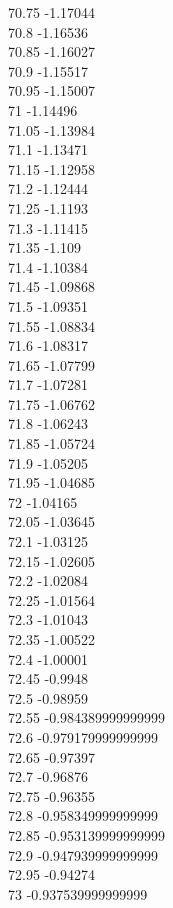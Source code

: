 {70.75	-1.17044\\
70.8	-1.16536\\
70.85	-1.16027\\
70.9	-1.15517\\
70.95	-1.15007\\
71	-1.14496\\
71.05	-1.13984\\
71.1	-1.13471\\
71.15	-1.12958\\
71.2	-1.12444\\
71.25	-1.1193\\
71.3	-1.11415\\
71.35	-1.109\\
71.4	-1.10384\\
71.45	-1.09868\\
71.5	-1.09351\\
71.55	-1.08834\\
71.6	-1.08317\\
71.65	-1.07799\\
71.7	-1.07281\\
71.75	-1.06762\\
71.8	-1.06243\\
71.85	-1.05724\\
71.9	-1.05205\\
71.95	-1.04685\\
72	-1.04165\\
72.05	-1.03645\\
72.1	-1.03125\\
72.15	-1.02605\\
72.2	-1.02084\\
72.25	-1.01564\\
72.3	-1.01043\\
72.35	-1.00522\\
72.4	-1.00001\\
72.45	-0.9948\\
72.5	-0.98959\\
72.55	-0.984389999999999\\
72.6	-0.979179999999999\\
72.65	-0.97397\\
72.7	-0.96876\\
72.75	-0.96355\\
72.8	-0.958349999999999\\
72.85	-0.953139999999999\\
72.9	-0.947939999999999\\
72.95	-0.94274\\
73	-0.937539999999999\\
}
